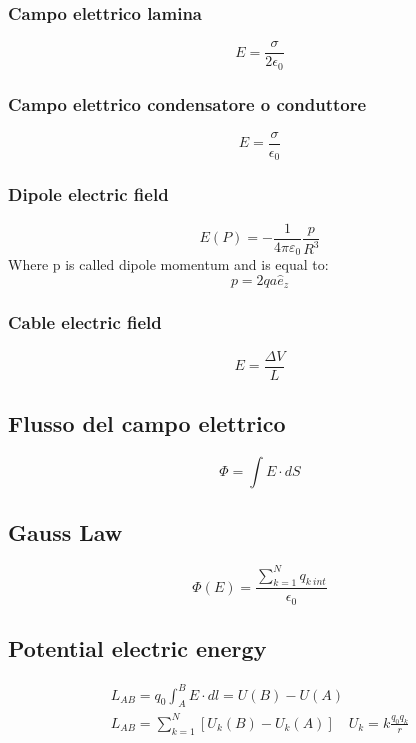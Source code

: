 \documentclass[Master.tex]{subfiles}
\begin{document}
\begin{multicols}{2}
				   \subsubsection{Campo elettrico lamina}
						    \[
								     E = \frac{\sigma }{2 \epsilon_{0}  }
						    \]

				   \subsubsection{Campo elettrico condensatore o conduttore}
						    \[
								     E = \frac{\sigma }{\epsilon _{0} }
						    \]

				   \subsubsection{Dipole electric field}
						    \[
								     E(P) =  -\frac{1}{4 \pi  \varepsilon_{0}}  \frac{p}{R^3}
						    \]
						    Where p is called dipole momentum and is equal to:
						    \[
								     p = 2qa\hat{e}_{z}
						    \]

				   \subsubsection{Cable electric field}
						    \[
								     E = \frac{\Delta V}{L}
						    \]

		  \subsection{Flusso del campo elettrico}

				   \[
						    \Phi = \int E \cdot dS
				   \]

		  \subsection{Gauss Law}
				   \[
						    \Phi (E) =  \frac{\sum_{k=1}^{N} q_{k~int} }{\epsilon _{0} }
				   \]

		  \subsection{Potential electric energy}
				   \begin{gather*}
						    L_{AB} = q_{0} \int_{A}^{B} E \cdot dl = U(B) - U(A)\\
						    L_{AB} = \sum_{k=1}^{N} [U_{k}(B)  - U_{k}(A)] \quad U_{k} = k \frac{q_0 q_{k} }{r}
				   \end{gather*}


\end{multicols}
\end{document}
